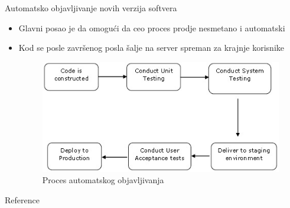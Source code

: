 \documentclass[10pt]{beamer}
\begin{document}
\begin{frame}[fragile]{Automatsko objavljivanje novih verzija softvera}
    \begin{itemize}
	\item Glavni posao je da omogući da ceo proces prodje nesmetano i automatski
	\item Kod se posle završenog posla šalje na server spreman za krajnje korisnike
	\begin{figure}
	    \includegraphics[scale=0.55]{slika2.jpg}
	    \caption{Proces automatskog objavljivanja}
	\end{figure}
    \end{itemize}
\end{frame}

\begin{frame}[allowframebreaks]{Reference}

  
  

\end{frame}
\end{document}
